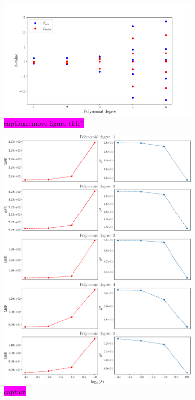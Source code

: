 \documentclass[aps,pra,english,notitlepage,reprint,nofootinbib]{revtex4-1}  %
\begin{document}
\begin{figure}
  \vspace*{-5pt}
  \centering %
  \includegraphics[width=0.9\textwidth]{../figs/a_beta_scaled_vs_raw.pdf}
  \caption{\colorbox{magenta}{caption}\colorbox{magenta}{remove figure title?}}\label{fig:a beta scaled vs raw}
  \vspace*{-5pt}
\end{figure}

\begin{figure}
  \vspace*{-5pt}
  \centering %
  \includegraphics[width=0.9\textwidth]{../figs/b_MSE_R2_vert.pdf}
  \caption{\colorbox{magenta}{caption}}\label{fig:b MSE R2}
  \vspace*{-5pt}
\end{figure}
\end{document}

